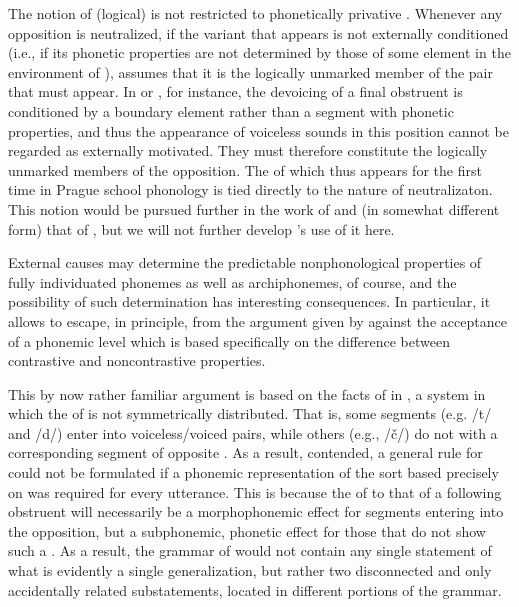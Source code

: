 The notion of (logical)  is not restricted to phonetically
privative . Whenever any opposition is neutralized, if the
variant that appears is not externally conditioned (i.e., if its
phonetic properties are not determined by those of some element in the
environment of ), {\Trubetzkoy} assumes that it is the
logically unmarked member of the pair that must appear. In  or
, for instance, the devoicing of a final obstruent is
conditioned by a boundary element rather than a segment with phonetic
properties, and thus the appearance of voiceless sounds in this
position cannot be regarded as externally motivated. They must
therefore constitute the logically unmarked members of the
opposition. The  of  which thus appears for the first
time in Prague school phonology is tied directly to the nature of
neutralizaton. This notion would be pursued further in the work of
{\Jakobson} and (in somewhat different form) that of \citet[ch.9]{spe},
but we will not further develop {\Trubetzkoy}'s use of it here.

External causes may determine the predictable nonphonological properties
of fully individuated phonemes as well as archiphonemes, of course,
and the possibility of such determination has interesting
consequences. In particular, it allows {\Trubetzkoy} to escape, in
principle, from the argument given by \citet[see below,
chapter~\ref{ch.genphon}]{halle:1957lsa,halle:spr} against the
acceptance of a phonemic level which is based specifically on the
difference between contrastive and noncontrastive properties.

This by now rather familiar argument is based on the facts of 
 in , a system in which the  of  is
not symmetrically distributed. That is, some segments (e.g. /t/ and
/d/) enter into voiceless/voiced pairs, while others (e.g., /č/) do
not  with a corresponding segment of opposite . As a
result, {\Halle} contended, a general rule for  
 could not be formulated if a phonemic representation of
the sort based precisely on  was required for every
utterance. This is because the  of  to that of a
following obstruent will necessarily be a morphophonemic effect for
segments entering into the  opposition, but a subphonemic,
phonetic effect for those that do not show such a . As a
result, the grammar of  would not contain any single statement
of what is evidently a single generalization, but rather two
disconnected and only accidentally related substatements, located in
different portions of the grammar.


